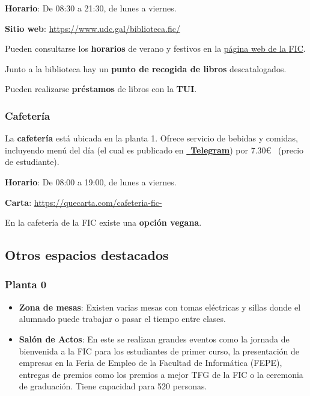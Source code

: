 \textbf{Horario}: De 08:30 a 21:30, de lunes a viernes.

\textbf{Sitio web}: \url{https://www.udc.gal/biblioteca.fic/}

\begin{infoBox}
    Pueden consultarse los \textbf{horarios} de verano y festivos en la \href{https://www.fic.udc.es/gl/biblioteca-0}{página web de la \acrshort{FIC}}.
\end{infoBox}

\begin{curiosityBox}
    Junto a la biblioteca hay un \textbf{punto de recogida de libros} descatalogados.
\end{curiosityBox}

\begin{rememberBox}
    Pueden realizarse \textbf{préstamos} de libros con la \textbf{\acrshort{TUI}}. 
\end{rememberBox}

\subsubsection{Cafetería}

La \textbf{cafetería} está ubicada en la planta 1. Ofrece servicio de bebidas y comidas, incluyendo menú del día (el cual es publicado en \href{https://t.me/CafeteriaFIC}{~\textbf{Telegram}}) por 7.30\euro~ (precio de estudiante).

\textbf{Horario}: De 08:00 a 19:00, de lunes a viernes.

\textbf{Carta}: \url{https://quecarta.com/cafeteria-fic-}

\begin{curiosityBox}
    En la cafetería de la \acrshort{FIC} existe una \textbf{opción vegana}.
\end{curiosityBox}

\subsection{Otros espacios destacados}

\subsubsection{Planta 0}

\begin{itemize}
    \item \textbf{Zona de mesas}: Existen varias mesas con tomas eléctricas y sillas donde el alumnado puede trabajar o pasar el tiempo entre clases.

    \item \textbf{Salón de Actos}: En este se realizan grandes eventos como la jornada de bienvenida a la \acrshort{FIC} para los estudiantes de primer curso, la presentación de empresas en la Feria de Empleo de la Facultad de Informática (\acrshort{FEPE}), entregas de premios como los premios a mejor \acrlong{TFG} de la \acrshort{FIC} o la ceremonia de graduación. Tiene capacidad para 520 personas.
\end{itemize}

